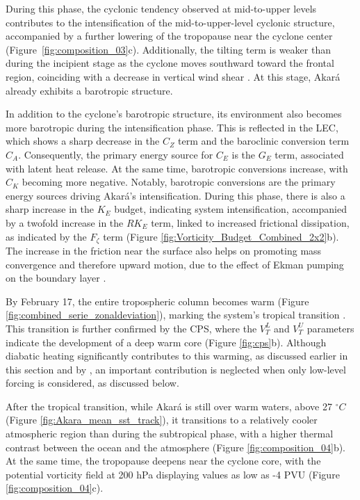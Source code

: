 \documentclass[pdflatex,sn-chicago]{sn-jnl}%
\theoremstyle{plain}
\theoremstyle{definition}
\theoremstyle{remark}
\theoremstyle{definition}
\begin{document}
During this phase, the cyclonic tendency observed at mid-to-upper levels contributes to the intensification of the mid-to-upper-level cyclonic structure, accompanied by a further lowering of the tropopause near the cyclone center (Figure~\ref{fig:composition_03}c). Additionally, the tilting term is weaker than during the incipient stage as the cyclone moves southward toward the frontal region, coinciding with a decrease in vertical wind shear \citep{reboita2024assessment}. At this stage, Akará already exhibits a barotropic structure.

In addition to the cyclone's barotropic structure, its environment also becomes more barotropic during the intensification phase. This is reflected in the LEC, which shows a sharp decrease in the $C_Z$ term and the baroclinic conversion term $C_A$. Consequently, the primary energy source for $C_E$ is the $G_E$ term, associated with latent heat release. At the same time, barotropic conversions increase, with $C_K$ becoming more negative. Notably, barotropic conversions are the primary energy sources driving Akará's intensification. During this phase, there is also a sharp increase in the $K_E$ budget, indicating system intensification, accompanied by a twofold increase in the $RK_E$ term, linked to increased frictional dissipation, as indicated by the $F_{\zeta}$ term (Figure \ref{fig:Vorticity_Budget_Combined_2x2}b). The increase in the friction near the surface also helps on promoting mass convergence and therefore upward motion, due to the effect of Ekman pumping on the boundary layer \citep[e.g.,]{hamouda2019ekman}.

By February 17, the entire tropospheric column becomes warm (Figure \ref{fig:combined_serie_zonaldeviation}), marking the system's tropical transition \citep{wood2023phase,reboita2024assessment}. This transition is further confirmed by the CPS, where the \(V_T^L\) and \(V_T^U\) parameters indicate the development of a deep warm core (Figure \ref{fig:cps}b). Although diabatic heating significantly contributes to this warming, as discussed earlier in this section and by \citet{reboita2024assessment}, an important contribution is neglected when only low-level forcing is considered, as discussed below.

After the tropical transition, while Akará is still over warm waters, above 27 $^{\circ}C$ (Figure \ref{fig:Akara_mean_sst_track}), it transitions to a relatively cooler atmospheric region than during the subtropical phase, with a higher thermal contrast between the ocean and the atmosphere (Figure \ref{fig:composition_04}b). At the same time, the tropopause deepens near the cyclone core, with the potential vorticity field at 200 hPa displaying values as low as -4 PVU (Figure \ref{fig:composition_04}c).
\end{document}
